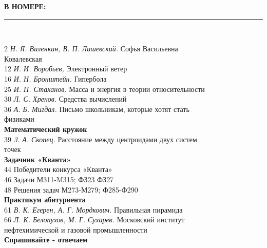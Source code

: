 \documentclass[10pt,a4paper]{article}
\begin{document}
\begin{spacing}{0.5}
\hspace*{-1ex}\textbf{В НОМЕРЕ:}\\
\hspace*{3ex}\rule{10.5cm}{0.4pt}\\
\end{spacing}
\hspace*{-2ex}2 \textit{Н. Я. Виленкин, В. П. Лишевский.} Софья Васильевна\\
\hspace*{3ex}Ковалевская\\
12 \textit{И. И. Воробьев,} Электронный ветер\\
16 \textit{И. Н. Бронштейн.} Гипербола\\
25 \textit{И. П. Стаханов.} Масса и энергия в теории относительности\\
30 \textit{Л. С. Хренов.} Средства вычислений\\
36 \textit{А. Б. Мигдал.} Письмо школьникам, которые хотят стать\\
\hspace*{3ex}физиками\\
\newline
\hspace*{3ex}\textbf{Математический кружок}\\
39 \textit{3. А. Скопец.} Расстояние между центроидами двух систем\\
\hspace*{3ex}точек\\
\newline
\hspace*{3ex}\textbf{Задачник «Кванта»}\\
44 Победители конкурса «Кванта»\\
46 Задачи М311-M315; ФЗ23 ФЗ27\\
48 Решения задач М273-М279; Ф285-Ф290\\
\newline
\hspace*{3ex}\textbf{Практикум абитуриента}\\
61 \textit{В. К. Егерен, А. Г. Мордкович.} Правильная пирамида\\
66 \textit{Л. К. Белопухов, М. Г. Сухарев.} Московский институт\\
\hspace*{3ex}нефтехимической и газовой промышленности\\
 \textbf{Спрашивайте - отвечаем}\\
\end{document}
